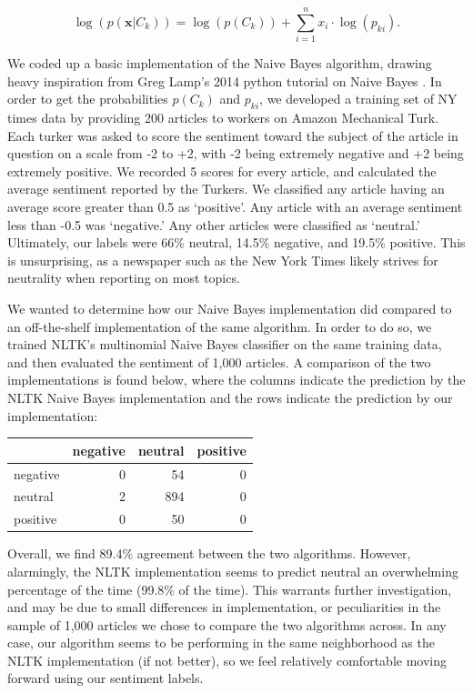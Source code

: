 \documentclass[fleqn,12pt]{SelfArx} %
\begin{document}
\begin{equation}
\log(p(\mathbf{x}|C_k)) = \log ( p(C_k)) + \sum_{i=1}^n x_i \cdot \log(p_{ki}).
\end{equation}

We coded up a basic implementation of the Naive Bayes algorithm, drawing heavy inspiration from Greg Lamp's 2014 python tutorial on Naive Bayes \cite{NaiveBayes}. In order to get the probabilities $p(C_k)$ and $p_{ki}$, we developed a training set of NY times data by providing 200 articles to workers on Amazon Mechanical Turk. Each turker was asked to score the sentiment toward the subject of the article in question on a scale from -2 to +2, with -2 being extremely negative and +2 being extremely positive. We recorded 5 scores for every article, and calculated the average sentiment reported by the Turkers. We classified any article having an average score greater than 0.5 as `positive'. Any article with an average sentiment less than -0.5 was `negative.' Any other articles were classified as `neutral.' Ultimately, our labels were 66\% neutral, 14.5\% negative, and 19.5\% positive. This is unsurprising, as a newspaper such as the New York Times likely strives for neutrality when reporting on most topics.

We wanted to determine how our Naive Bayes implementation did compared to an off-the-shelf implementation of the same algorithm. In order to do so, we trained NLTK's multinomial Naive Bayes classifier on the same training data, and then evaluated the sentiment of 1,000 articles. A comparison of the two implementations is found below, where the columns indicate the prediction by the NLTK Naive Bayes implementation and the rows indicate the prediction by our implementation:

\vspace{10 mm}

\begin{tabular}{l | r r r}
\toprule
  & negative & neutral & positive\\
\midrule
negative & 0 & 54 & 0\\
neutral & 2 & 894 & 0\\
positive & 0 & 50 & 0\\
\end{tabular}

\vspace{10 mm}

Overall, we find 89.4\% agreement between the two algorithms. However, alarmingly, the NLTK implementation seems to predict neutral an overwhelming percentage of the time (99.8\% of the time). This warrants further investigation, and may be due to small differences in implementation, or peculiarities in the sample of 1,000 articles we chose to compare the two algorithms across. In any case, our algorithm seems to be performing in the same neighborhood as the NLTK implementation (if not better), so we feel relatively comfortable moving forward using our sentiment labels.
\end{document}
